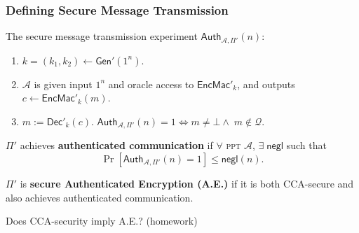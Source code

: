 \begin{frame}\frametitle{Defining Secure Message Transmission}
The secure message transmission experiment $\mathsf{Auth}_{\mathcal{A},\Pi'}(n)$:
\begin{enumerate}
\item $k = (k_1,k_2) \gets \mathsf{Gen}'(1^n)$.
\item $\mathcal{A}$ is given input $1^n$ and oracle access to $\mathsf{EncMac'}_k$, and outputs $c \gets \mathsf{EncMac'}_{k}(m)$.
\item $m := \mathsf{Dec}'_k(c)$. $\mathsf{Auth}_{\mathcal{A},\Pi'}(n) = 1 \iff m \ne \bot \land\; m \notin \mathcal{Q}$.
\end{enumerate}
\begin{definition}
$\Pi'$ achieves \textbf{authenticated communication} if $\forall$ \textsc{ppt} $\mathcal{A}$, $\exists\; \mathsf{negl}$ such that
\[ \Pr[\mathsf{Auth}_{\mathcal{A},\Pi'}(n) = 1] \le \mathsf{negl}(n).
\]
\end{definition}
\begin{definition}
$\Pi'$ is \textbf{secure Authenticated Encryption (A.E.)} if it is both CCA-secure and also achieves authenticated communication.%
\end{definition}
\begin{alertblock}{Does CCA-security imply A.E.? (homework)}
\end{alertblock}
\end{frame}
